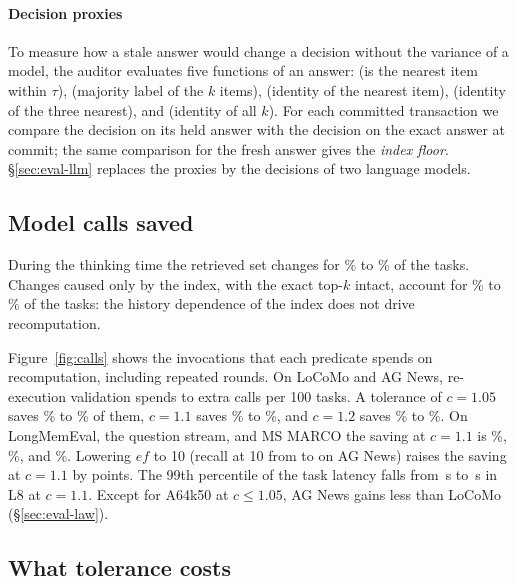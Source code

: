 \documentclass[sigconf, nonacm, review]{acmart}
\begin{document}
\paragraph{Decision proxies}
To measure how a stale answer would change a decision without the
variance of a model, the auditor evaluates five functions of an answer:
 (is the nearest item
within $\tau$),  (majority label of the $k$ items),
 (identity of the nearest item),  (identity of the
three nearest), and  (identity of all $k$). For each committed
transaction we compare the decision on its held answer with the
decision on the exact answer at commit; the same comparison for the
fresh answer gives the \emph{index floor}.
\S\ref{sec:eval-llm} replaces the proxies by the decisions of two
language models.

\subsection{Model calls saved}
\label{sec:eval-save}

During the thinking time the retrieved set changes for
\% to \% of the tasks. Changes
caused only by the index, with the exact top-$k$ intact, account for
\% to \% of the tasks: the
history dependence of the index does not drive recomputation.

Figure~\ref{fig:calls} shows the invocations that each predicate
spends on recomputation, including repeated rounds. On LoCoMo and
AG News, re-execution validation spends  to 
extra calls per 100 tasks. A tolerance of $c=1.05$ saves
\% to \% of them, $c=1.1$ saves
\% to \%, and $c=1.2$ saves
\% to \%. On LongMemEval, the
question stream, and MS MARCO the saving at $c=1.1$ is
\%, \%, and
\%. Lowering $\mathit{ef}$ to 10 (recall at 10
from  to  on AG News)
raises the saving at $c=1.1$ by  points. The 99th percentile of the
task latency falls from \,s to
\,s in L8 at $c=1.1$. Except for A64k50 at $c\le 1.05$, AG News
gains less than LoCoMo (\S\ref{sec:eval-law}).

\subsection{What tolerance costs}
\label{sec:eval-cost}
\end{document}

